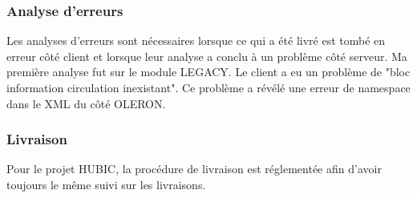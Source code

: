 \subsubsection {Analyse d'erreurs}
Les analyses d'erreurs sont nécessaires lorsque ce qui a été livré est tombé en erreur côté client et lorsque leur analyse a conclu à un problème côté serveur. Ma première analyse fut sur le module LEGACY. Le client a eu un problème de "bloc information circulation inexistant". Ce problème a révélé une erreur de namespace dans le XML du côté OLERON.

\subsubsection {Livraison}
Pour le projet HUBIC, la procédure de livraison est réglementée afin d'avoir toujours le même suivi sur les livraisons.
